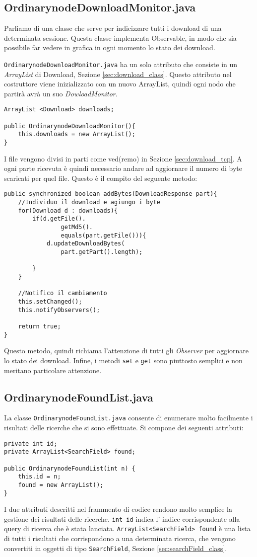 \subsection{OrdinarynodeDownloadMonitor.java}
Parliamo di una classe che serve per indicizzare tutti i download di una determinata sessione.
Questa classe implementa Observable, in modo che sia possibile far vedere in grafica in ogni momento lo stato dei download.

\verb|OrdinarynodeDownloadMonitor.java| ha un solo attributo che consiste in un \emph{ArrayList} di Download, Sezione \ref{sec:download_class}.
Questo attributo nel costruttore viene inizializzato con un nuovo ArrayList, quindi ogni nodo che partirà avrà un suo \emph{DowloadMonitor}.
\begin{lstlisting}
ArrayList <Download> downloads;
    
public OrdinarynodeDownloadMonitor(){
	this.downloads = new ArrayList();
}
\end{lstlisting}

I file vengono divisi in parti come ved(remo) in Sezione \ref{sec:download_tcp}. A ogni parte ricevuta è quindi necessario andare ad aggiornare il numero di byte scaricati per quel file.
Questo è il compito del seguente metodo:
\begin{lstlisting}
public synchronized boolean addBytes(DownloadResponse part){
	//Individuo il download e agiungo i byte
	for(Download d : downloads){
		if(d.getFile().
				getMd5().
				equals(part.getFile())){
			d.updateDownloadBytes(
				part.getPart().length);
			
		}
	}

	//Notifico il cambiamento
	this.setChanged();
	this.notifyObservers();

	return true;
}
\end{lstlisting}

Questo metodo, quindi richiama l'attenzione di tutti gli \emph{Observer} per aggiornare lo stato dei download.
Infine, i metodi \verb|set| e \verb|get| sono piuttosto semplici e non meritano particolare attenzione.

\subsection{OrdinarynodeFoundList.java}
La classe \verb|OrdinarynodeFoundList.java| consente di enumerare molto facilmente i risultati delle ricerche che si sono effettuate.
Si compone dei seguenti attributi:
\begin{lstlisting}
private int id;
private ArrayList<SearchField> found;

public OrdinarynodeFoundList(int n) {
	this.id = n;
	found = new ArrayList();
}
\end{lstlisting}
I due attributi descritti nel frammento di codice rendono molto semplice la gestione dei risultati delle ricerche.
\verb|int id| indica l' indice corrispondente alla query di ricerca che è stata lanciata.
\verb|ArrayList<SearchField> found| è una lista di tutti i risultati che corrispondono a una determinata ricerca, che vengono convertiti in oggetti di tipo \verb|SearchField|, Sezione \ref{sec:searchField_class}.

